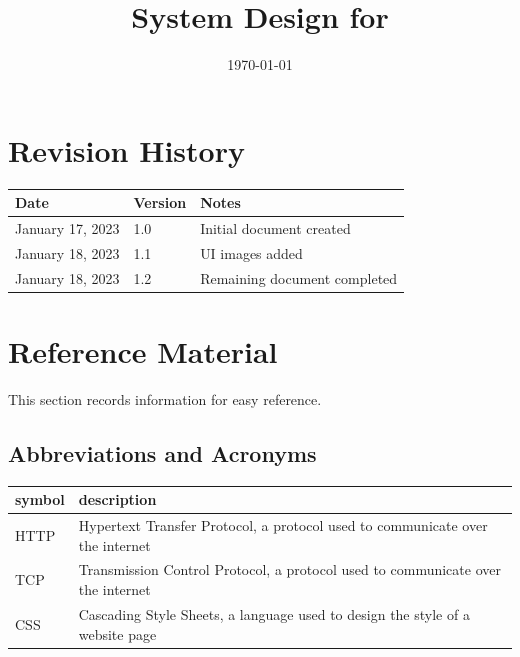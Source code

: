 \documentclass[12pt, titlepage]{article}
\begin{document}
	
	\title{System Design for \progname{}} 
	\author{\authname}
	\date{\today}
	
	\maketitle
	
	
	\section{Revision History}
	
	\begin{tabularx}{\textwidth}{p{3cm}p{2cm}X}
		\toprule {\bf Date} & {\bf Version} & {\bf Notes}\\
		\midrule
		January 17, 2023 & 1.0 & Initial document created\\
		January 18, 2023 & 1.1 & UI images added\\
		January 18, 2023 & 1.2 & Remaining document completed\\
		\bottomrule
	\end{tabularx}
	
	\newpage
	
	\section{Reference Material}
	
	This section records information for easy reference.
	
	\subsection{Abbreviations and Acronyms}
	
	\renewcommand{\arraystretch}{1.2}
	\begin{tabular}{l l} 
		\toprule		
		\textbf{symbol} & \textbf{description}\\
		\midrule 
		HTTP & Hypertext Transfer Protocol, a protocol used to communicate over the internet\\
		TCP & Transmission Control Protocol, a protocol used to communicate over the internet\\
		CSS & Cascading Style Sheets, a language used to design the style of a website page\\
		\bottomrule
	\end{tabular}\\
	
	\newpage
	
\end{document}
